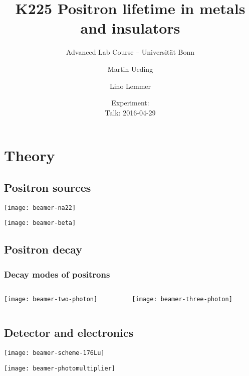 \documentclass[english, fleqn]{beamer}
\title{K225 Positron lifetime in metals and insulators}
\subtitle{Advanced Lab Course -- Universität Bonn}
\author{%
    Martin Ueding
    \and
    Lino Lemmer
}
\date{Experiment: \daterange{2016-03-24}{2016-03-25} \\ Talk: 2016-04-29}
\begin{document}
\begin{frame}
    \titlepage
\end{frame}

\section{Theory}

\subsection{Positron sources}

\begin{frame}

    \centering
    \texttt{[image: beamer-na22]}
\end{frame}

\begin{frame}

    \centering
    \texttt{[image: beamer-beta]}
\end{frame}

\subsection{Positron decay}

\begin{frame}
    \frametitle{Decay modes of positrons}

    \begin{columns}[c]
        \begin{column}{.5\textwidth}
            \centering
            \texttt{[image: beamer-two-photon]}
        \end{column}
        \begin{column}{.5\textwidth}
            \centering
            \texttt{[image: beamer-three-photon]}
        \end{column}
    \end{columns}
\end{frame}

\subsection{Detector and electronics}

\begin{frame}
    \centering
    \texttt{[image: beamer-scheme-176Lu]}
\end{frame}

\begin{frame}
    \centering
    \texttt{[image: beamer-photomultiplier]}
\end{frame}
\end{document}

